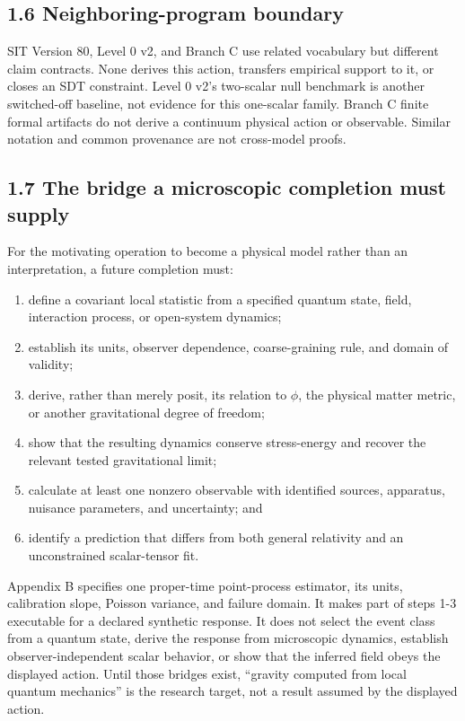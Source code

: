 \documentclass[
  american,
  11pt,
  letterpaper,
]{article}
\providecommand{\tightlist}{%
  \setlength{\itemsep}{0pt}\setlength{\parskip}{0pt}}
\begin{document}
\subsection{1.6 Neighboring-program boundary}\label{neighboring-program-boundary}

SIT Version 80, Level 0 v2, and Branch C use related vocabulary but different claim contracts. None derives this action, transfers empirical support to it, or closes an SDT constraint. Level 0 v2's two-scalar null benchmark is another switched-off baseline, not evidence for this one-scalar family. Branch C finite formal artifacts do not derive a continuum physical action or observable. Similar notation and common provenance are not cross-model proofs.

\subsection{1.7 The bridge a microscopic completion must supply}\label{the-bridge-a-microscopic-completion-must-supply}

For the motivating operation to become a physical model rather than an interpretation, a future completion must:

\begin{enumerate}
\def\labelenumi{\arabic{enumi}.}
\tightlist
\item
  define a covariant local statistic from a specified quantum state, field, interaction process, or open-system dynamics;
\item
  establish its units, observer dependence, coarse-graining rule, and domain of validity;
\item
  derive, rather than merely posit, its relation to \(\phi\), the physical matter metric, or another gravitational degree of freedom;
\item
  show that the resulting dynamics conserve stress-energy and recover the relevant tested gravitational limit;
\item
  calculate at least one nonzero observable with identified sources, apparatus, nuisance parameters, and uncertainty; and
\item
  identify a prediction that differs from both general relativity and an unconstrained scalar-tensor fit.
\end{enumerate}

Appendix B specifies one proper-time point-process estimator, its units, calibration slope, Poisson variance, and failure domain. It makes part of steps 1-3 executable for a declared synthetic response. It does not select the event class from a quantum state, derive the response from microscopic dynamics, establish observer-independent scalar behavior, or show that the inferred field obeys the displayed action. Until those bridges exist, ``gravity computed from local quantum mechanics'' is the research target, not a result assumed by the displayed action.
\end{document}
